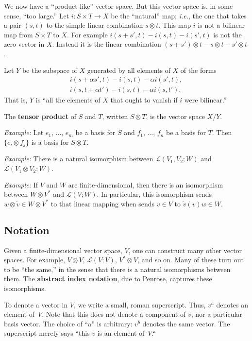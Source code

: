 \documentclass[10pt, a4paper, twocolumn]{article}
\newcommand{\defn}[1]{\textbf{#1}}
\begin{document}
We now have a “product-like” vector space. But this vector space is, in some
sense, “too large.” Let $i: S\times T\to X$ be the “natural” map; \emph{i.e.}, the one
that takes a pair $(s,t)$ to the simple linear combination $s\otimes t$. This map $i$
is not a bilinear map from $S\times T$ to $X$. For example $i(s + s',t) - i(s,t) -
i(s',t)$ is not the zero vector in $X$. Instead it is the linear combination
$(s+s')\otimes t - s\otimes t - s'\otimes t$.

Let $Y$ be the subspace of $X$ generated by all elements of $X$ of the forms
\begin{gather*}
  i(s + \alpha s', t) - i(s,t) - \alpha i(s', t), \\
  i(s, t + \alpha t') - i(s,t) - \alpha i(s, t').
\end{gather*}
That is, $Y$ is “all the elements of $X$ that ought to vanish if $i$ were
bilinear.”

The \defn{tensor product} of $S$ and $T$, written $S\otimes T$, is the vector space
$X/Y$.

\emph{Example:} Let $e_1$, ..., $e_m$ be a basis for $S$ and $f_1$, ..., $f_n$
be a basis for $T$. Then $\{e_i\otimes f_j\}$ is a basis for $S\otimes T$.

\emph{Example:} There is a natural isomorphism between $\mathcal{L}(V_1, V_2;
W)$ and $\mathcal{L}(V_1 \otimes V_2; W)$.

\emph{Example:} If $V$ and $W$ are finite-dimensional, then there is an
isomorphism between $W \otimes V^*$ and $\mathcal{L}(V; W)$. In particular, this
isomorphism sends $w\otimes \tilde{v} \in W\otimes V^*$ to that linear mapping when sends $v\in
V$ to $\tilde{v}(v)w \in W$.

\subsection{Notation} 

Given a finite-dimensional vector space, $V$, one can construct many other
vector spaces. For example, $V\otimes V$, $\mathcal{L}(V;V)$, $V^*\otimes V$, and so
on. Many of these turn out to be “the same,” in the sense that there is a
natural isomorphisms between them. The \defn{abstract index notation}, due to
Penrose, captures these isomorphisms.

To denote a vector in $V$, we write a small, roman superscript. Thus, $v^a$
denotes an element of~$V$. Note that this does not denote a component of $v$, nor a
particular basis vector. The choice of “a” is arbitrary: $v^b$ denotes the same
vector. The superscript merely says “this $v$ is an element of~$V$.“
\end{document}

